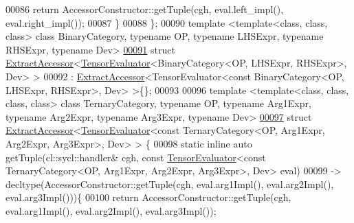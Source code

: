 \begin{DoxyCode}
00086     \textcolor{keywordflow}{return} AccessorConstructor::getTuple(cgh, eval.left\_impl(), eval.right\_impl());
00087   \}
00088 \};
00090 \textcolor{keyword}{template} <\textcolor{keyword}{template}<\textcolor{keyword}{class}, \textcolor{keyword}{class}, \textcolor{keyword}{class}> \textcolor{keyword}{class }BinaryCategory, \textcolor{keyword}{typename} OP,  \textcolor{keyword}{typename} LHSExpr, \textcolor{keyword}{typename} 
      RHSExpr, \textcolor{keyword}{typename} Dev>
\hyperlink{struct_eigen_1_1_tensor_sycl_1_1internal_1_1_extract_accessor_3_01_tensor_evaluator_3_01_binary_6539dfdd8ebae0bc4a33defdc23ba0ac}{00091} \textcolor{keyword}{struct }\hyperlink{struct_eigen_1_1_tensor_sycl_1_1internal_1_1_extract_accessor}{ExtractAccessor}<\hyperlink{struct_eigen_1_1_tensor_evaluator}{TensorEvaluator}<BinaryCategory<OP, LHSExpr, RHSExpr>, 
      Dev> >
00092 : \hyperlink{struct_eigen_1_1_tensor_sycl_1_1internal_1_1_extract_accessor}{ExtractAccessor}<TensorEvaluator<const BinaryCategory<OP, LHSExpr, RHSExpr>, Dev> >\{\};
00093 
00096 \textcolor{keyword}{template} <\textcolor{keyword}{template}<\textcolor{keyword}{class}, \textcolor{keyword}{class}, \textcolor{keyword}{class}, \textcolor{keyword}{class}> \textcolor{keyword}{class }TernaryCategory, \textcolor{keyword}{typename} OP, \textcolor{keyword}{typename} Arg1Expr, \textcolor{keyword}{
      typename} Arg2Expr, \textcolor{keyword}{typename} Arg3Expr, \textcolor{keyword}{typename} Dev>
\hyperlink{struct_eigen_1_1_tensor_sycl_1_1internal_1_1_extract_accessor_3_01_tensor_evaluator_3_01const_010235c7f46e01985cfd9706474c83e49e}{00097} \textcolor{keyword}{struct }\hyperlink{struct_eigen_1_1_tensor_sycl_1_1internal_1_1_extract_accessor}{ExtractAccessor}<\hyperlink{struct_eigen_1_1_tensor_evaluator}{TensorEvaluator}<const TernaryCategory<OP, Arg1Expr, 
      Arg2Expr, Arg3Expr>, Dev> > \{
00098   \textcolor{keyword}{static} \textcolor{keyword}{inline} \textcolor{keyword}{auto} getTuple(cl::sycl::handler& cgh, \textcolor{keyword}{const} \hyperlink{struct_eigen_1_1_tensor_evaluator}{TensorEvaluator}<\textcolor{keyword}{const} 
      TernaryCategory<OP, Arg1Expr, Arg2Expr, Arg3Expr>, Dev> eval)
00099   -> decltype(AccessorConstructor::getTuple(cgh, eval.arg1Impl(), eval.arg2Impl(), eval.arg3Impl()))\{
00100     \textcolor{keywordflow}{return} AccessorConstructor::getTuple(cgh, eval.arg1Impl(), eval.arg2Impl(), eval.arg3Impl());

\end{DoxyCode}
